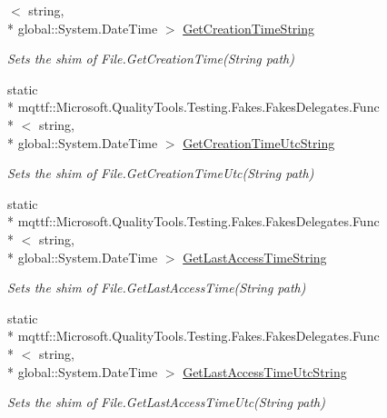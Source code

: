 \begin{DoxyCompactItemize}
$<$ string, \\*
global\-::\-System.\-Date\-Time $>$ \hyperlink{class_system_1_1_i_o_1_1_fakes_1_1_shim_file_aca2b6909f3890dffc7a9c75f6acded33}{Get\-Creation\-Time\-String}
\begin{DoxyCompactList}\small\item\em Sets the shim of File.\-Get\-Creation\-Time(\-String path)\end{DoxyCompactList}\item 
static \\*
mqttf\-::\-Microsoft.\-Quality\-Tools.\-Testing.\-Fakes.\-Fakes\-Delegates.\-Func\\*
$<$ string, \\*
global\-::\-System.\-Date\-Time $>$ \hyperlink{class_system_1_1_i_o_1_1_fakes_1_1_shim_file_a50b878e1e36959708af2103331eac25e}{Get\-Creation\-Time\-Utc\-String}
\begin{DoxyCompactList}\small\item\em Sets the shim of File.\-Get\-Creation\-Time\-Utc(\-String path)\end{DoxyCompactList}\item 
static \\*
mqttf\-::\-Microsoft.\-Quality\-Tools.\-Testing.\-Fakes.\-Fakes\-Delegates.\-Func\\*
$<$ string, \\*
global\-::\-System.\-Date\-Time $>$ \hyperlink{class_system_1_1_i_o_1_1_fakes_1_1_shim_file_a932fe5500bb86d41fb0fe95d9824a8b9}{Get\-Last\-Access\-Time\-String}
\begin{DoxyCompactList}\small\item\em Sets the shim of File.\-Get\-Last\-Access\-Time(\-String path)\end{DoxyCompactList}\item 
static \\*
mqttf\-::\-Microsoft.\-Quality\-Tools.\-Testing.\-Fakes.\-Fakes\-Delegates.\-Func\\*
$<$ string, \\*
global\-::\-System.\-Date\-Time $>$ \hyperlink{class_system_1_1_i_o_1_1_fakes_1_1_shim_file_a9a300401cff73adf2bae5fd17174186f}{Get\-Last\-Access\-Time\-Utc\-String}
\begin{DoxyCompactList}\small\item\em Sets the shim of File.\-Get\-Last\-Access\-Time\-Utc(\-String path)\end{DoxyCompactList}\item 

\end{DoxyCompactItemize}
